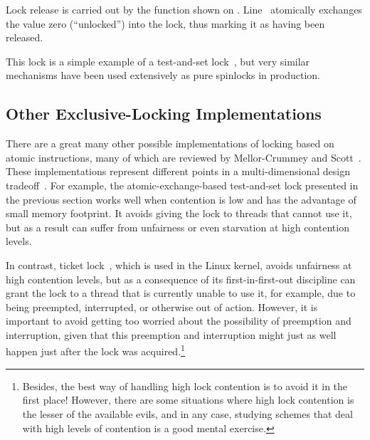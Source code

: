 \begin{fcvref}
Lock release is carried out by the  function
shown on .
Line~ atomically exchanges the value zero (``unlocked'') into
the lock, thus marking it as having been released.
\end{fcvref}

\QuickQuizEnd

This lock is a simple example of a test-and-set lock~\cite{Segall84},
but very similar
mechanisms have been used extensively as pure spinlocks in production.

\subsection{Other Exclusive-Locking Implementations}
\label{sec:locking:Other Exclusive-Locking Implementations}

There are a great many other possible implementations of locking
based on atomic instructions, many of which are reviewed
by Mellor-Crummey and Scott~\cite{MellorCrummey91a}.
These implementations represent different points in a multi-dimensional
design tradeoff~\cite{Guerraoui:2019:LPA:3319851.3301501,HugoGuirouxPhD,McKenney96a}.
For example,
the atomic-exchange-based test-and-set lock presented in the previous
section works well when contention is low and has the advantage
of small memory footprint.
It avoids giving the lock to threads that cannot use it, but as
a result can suffer from unfairness or even starvation at high
contention levels.

In contrast, ticket lock~\cite{MellorCrummey91a}, which is used in the Linux
kernel, avoids unfairness at high contention levels, but as a
consequence of its first-in-first-out discipline can grant the
lock to a thread that is currently unable to use it, for example,
due to being preempted, interrupted, or otherwise out of action.
However, it is important to avoid getting too worried about the
possibility of preemption and interruption, given that this preemption
and interruption might just as well happen just after the lock was
acquired.\footnote{
	Besides, the best way of handling high lock contention is to avoid
	it in the first place!
	However, there are some situations where high lock contention
	is the lesser of the available evils, and in any case, studying
	schemes that deal with high levels of contention is a good mental
	exercise.}

